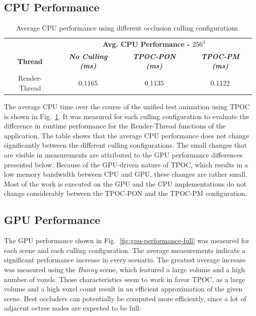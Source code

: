 \documentclass[conference]{IEEEtran}
\begin{document}
\subsection{CPU Performance} \label{subsec-cou-performance}

\begin{table}[htbp]
    \caption{Average \ac{CPU} performance using different occlusion culling configurations.}
    \begin{center}
        \begin{tabular}{|c|c|c|c|}
            \hline
            \textbf{}&\multicolumn{3}{|c|}{\textbf{Avg. \ac{CPU} Performance - $256^3$}} \\
            \cline{2-4} 
            \textbf{Thread} & \textbf{\textit{No Culling (ms)}} & \textbf{\textit{\ac{TPOC-PON} (ms)}} & \textbf{\textit{\ac{TPOC-PM} (ms)}}  \\
            \hline
            Render-Thread      &  0.1165   & 0.1135    &  0.1122   \\
            \hline
        \end{tabular}
    \label{tab:cpu-performance}
    \end{center}
\end{table}

\noindent
The average \ac{CPU} time over the course of the unified test animation using \ac{TPOC} is shown in 
Fig.~\ref{tab:cpu-performance}. It was measured for each culling configuration to evaluate the difference 
in runtime performance for the Render-Thread functions of the application. The table shows that the average 
\ac{CPU} performance does not change significantly between the different culling configurations. The small 
changes that are visible in measurements are attributed to the \ac{GPU} performance differences presented 
below. Because of the \ac{GPU}-driven nature of \ac{TPOC}, which results in a low memory bandwidth between 
\ac{CPU} and \ac{GPU}, these changes are rather small. Most of the work is executed on the \ac{GPU} and the 
\ac{CPU} implementations do not change considerably between the \ac{TPOC-PON} and the \ac{TPOC-PM} 
configuration. \\


\subsection{GPU Performance} \label{subsec-gpu-performance}

\noindent
The \ac{GPU} performance shown in Fig.~\ref{fig:gpu-performance-full} was measured for each scene and each 
culling configuration. The average measurements indicate a significant performance increase in every scenario. 
The greatest average increase was measured using the \emph{Bunny} scene, which featured a large volume and a 
high number of voxels. Those characteristics seem to work in favor \ac{TPOC}, as a large volume and a high 
voxel count result in an efficient approximation of the given scene. Best occluders can potentially be computed 
more efficiently, since a lot of adjacent octree nodes are expected to be full. \\
\end{document}
